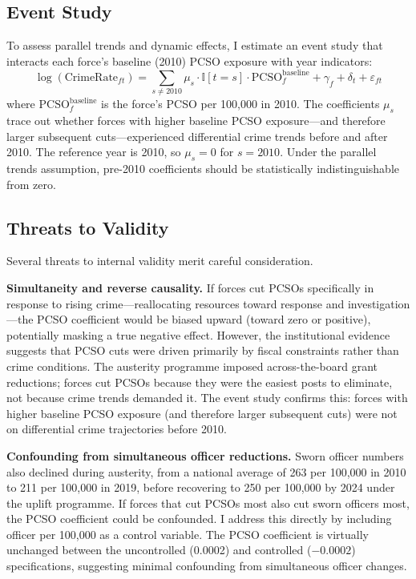 \documentclass[12pt]{article}
\newcommand{\ind}{\mathbb{I}}
\begin{document}
\subsection{Event Study}

To assess parallel trends and dynamic effects, I estimate an event study that interacts each force's baseline (2010) PCSO exposure with year indicators:
\begin{equation}
\log(\text{CrimeRate}_{ft}) = \sum_{s \neq 2010} \mu_s \cdot \ind[t = s] \cdot \text{PCSO}^{\text{baseline}}_f + \gamma_f + \delta_t + \varepsilon_{ft}
\label{eq:event}
\end{equation}
where $\text{PCSO}^{\text{baseline}}_f$ is the force's PCSO per 100,000 in 2010. The coefficients $\mu_s$ trace out whether forces with higher baseline PCSO exposure---and therefore larger subsequent cuts---experienced differential crime trends before and after 2010. The reference year is 2010, so $\mu_s = 0$ for $s = 2010$. Under the parallel trends assumption, pre-2010 coefficients should be statistically indistinguishable from zero.

\subsection{Threats to Validity}

Several threats to internal validity merit careful consideration.

\textbf{Simultaneity and reverse causality.} If forces cut PCSOs specifically in response to rising crime---reallocating resources toward response and investigation---the PCSO coefficient would be biased upward (toward zero or positive), potentially masking a true negative effect. However, the institutional evidence suggests that PCSO cuts were driven primarily by fiscal constraints rather than crime conditions. The austerity programme imposed across-the-board grant reductions; forces cut PCSOs because they were the easiest posts to eliminate, not because crime trends demanded it. The event study confirms this: forces with higher baseline PCSO exposure (and therefore larger subsequent cuts) were not on differential crime trajectories before 2010.

\textbf{Confounding from simultaneous officer reductions.} Sworn officer numbers also declined during austerity, from a national average of 263 per 100,000 in 2010 to 211 per 100,000 in 2019, before recovering to 250 per 100,000 by 2024 under the uplift programme. If forces that cut PCSOs most also cut sworn officers most, the PCSO coefficient could be confounded. I address this directly by including officer per 100,000 as a control variable. The PCSO coefficient is virtually unchanged between the uncontrolled (0.0002) and controlled ($-0.0002$) specifications, suggesting minimal confounding from simultaneous officer changes.
\end{document}
